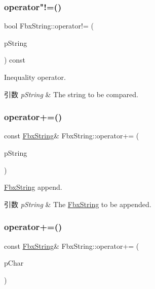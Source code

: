 \subsubsection{\texorpdfstring{operator"!=()}{operator!=()}\hspace{0.1cm}{\footnotesize\ttfamily [2/2]}}
{\footnotesize\ttfamily bool Fbx\+String\+::operator!= (\begin{DoxyParamCaption}\item[{const char $\ast$}]{p\+String }\end{DoxyParamCaption}) const}

Inequality operator. 
\begin{DoxyParams}{引数}
{\em p\+String} & The string to be compared. \\
\hline
\end{DoxyParams}
\mbox{\label{class_fbx_string_a61556f3132a5612b7d3fe89617a42603}} 
\subsubsection{\texorpdfstring{operator+=()}{operator+=()}\hspace{0.1cm}{\footnotesize\ttfamily [1/6]}}
{\footnotesize\ttfamily const \hyperlink{class_fbx_string}{Fbx\+String}\& Fbx\+String\+::operator+= (\begin{DoxyParamCaption}\item[{const \hyperlink{class_fbx_string}{Fbx\+String} \&}]{p\+String }\end{DoxyParamCaption})}

\hyperlink{class_fbx_string}{Fbx\+String} append. 
\begin{DoxyParams}{引数}
{\em p\+String} & The \hyperlink{class_fbx_string}{Fbx\+String} to be appended. \\
\hline
\end{DoxyParams}
\mbox{\label{class_fbx_string_adb9fec07c30fee7840adbc5f32012d5f}} 
\subsubsection{\texorpdfstring{operator+=()}{operator+=()}\hspace{0.1cm}{\footnotesize\ttfamily [2/6]}}
{\footnotesize\ttfamily const \hyperlink{class_fbx_string}{Fbx\+String}\& Fbx\+String\+::operator+= (\begin{DoxyParamCaption}\item[{char}]{p\+Char }\end{DoxyParamCaption})}

